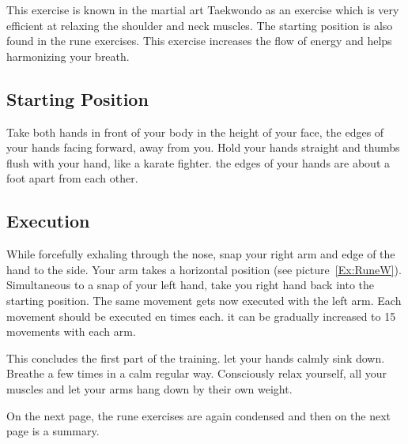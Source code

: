 \documentclass[../main.tex]{subfiles}
\begin{document}
 This exercise is known in the martial art Taekwondo as an exercise which is very efficient at relaxing the shoulder and neck muscles. The starting position is also found in the rune exercises. This exercise increases the flow of energy and helps harmonizing your breath.
 
 \subsection*{Starting Position}
 
 Take both hands in front of your body in the height of your face, the edges of your hands facing forward, away from you.
 Hold your hands straight and thumbs flush with your hand, like a karate fighter.
 the edges of your hands are about a foot apart from each other.
 
 \subsection*{Execution}
 While forcefully exhaling through the nose, snap your right arm and edge of the hand to the side. Your arm takes a horizontal position (see picture~\ref{Ex:RuneW}).
 Simultaneous to a snap of your left hand, take you right hand back into the starting position.
 The same movement gets now executed with the left arm.
 Each movement should be executed en times each. 
 it can be gradually increased to 15 movements with each arm.
 
 
 This concludes the first part of the training. let your hands calmly sink down. Breathe a few times in a calm regular way. Consciously relax yourself, all your muscles and let your arms hang down by their own weight.
 
 On the next page, the rune exercises are again condensed and then on the next page is a summary.
 
 \newpage
 
 
\end{document}
